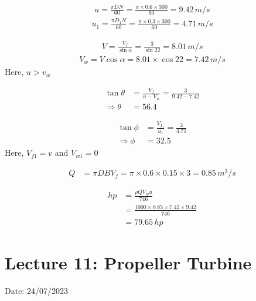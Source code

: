 \documentclass{article}
\begin{document}
\begin{multicols}{2}
\begin{align*}
  u = \frac{\pi D N}{60} = \frac{\pi \times 0.6 \times 300}{60} = 9.42 \, m/s 
\end{align*}
\begin{align*}
  u_1 = \frac{\pi D_1 N}{60} = \frac{\pi \times 0.3 \times 300}{60} = 4.71 \, m/s 
\end{align*}

\begin{align*}
  V = \frac{V_f}{\sin \alpha} = \frac{3}{\sin 22} = 8.01 \, m/s 
\end{align*}
\begin{align*}
  V_w = V \cos \alpha = 8.01 \times \cos 22 = 7.42 \, m/s 
\end{align*}
Here, $u>v_w$

\begin{align*}
  \tan \theta &= \frac{V_f}{u-V_w} = \frac{3}{9.42-7.42}\\
  \Rightarrow \theta &= 56.4
\end{align*}

\begin{align*}
  \tan \phi &= \frac{V_{f_1}}{u_1} = \frac{3}{4.71} \\
  \Rightarrow \phi &= 32.5
\end{align*}
Here, $V_{f1} = v$ and $V_{w1}=0$

\begin{align*}
  Q &= \pi D B V_f = \pi \times 0.6 \times 0.15 \times 3 = 0.85 \, m^3/s
\end{align*}

\begin{align*}
  hp &= \frac{\rho Q V_w u}{746} \\
  &= \frac{1000 \times 0.85 \times 7.42 \times 9.42}{746}\\
  &= 79.65 \, hp
\end{align*}

\end{multicols}

\section{Lecture 11: Propeller Turbine}
\hfill Date: 24/07/2023
\end{document}
